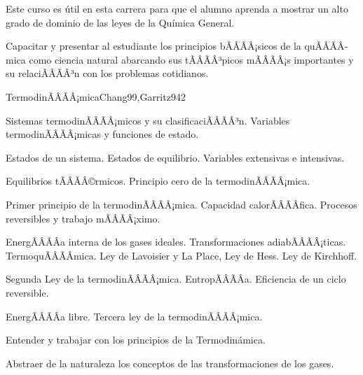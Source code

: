\begin{sumilla}


\begin{fundamentacion}
Este curso es \'util en esta carrera para que el alumno aprenda a mostrar un alto grado de dominio de las leyes de la Qu\'imica General.
\end{fundamentacion}

\begin{objetivosdelcurso}
\item Capacitar y presentar al estudiante los principios bÃÂÃÂ¡sicos de la quÃÂÃÂ­mica como ciencia natural abarcando sus tÃÂÃÂ³picos mÃÂÃÂ¡s importantes y su relaciÃÂÃÂ³n con los problemas cotidianos.
\end{objetivosdelcurso}

\begin{outcomes}
\end{outcomes}

\begin{unit}{TermodinÃÂÃÂ¡mica}{Chang99,Garritz94}{2}
\begin{topicos}
	\item Sistemas termodinÃÂÃÂ¡micos y su clasificaciÃÂÃÂ³n. Variables termodinÃÂÃÂ¡micas y funciones de estado.
	\item Estados de un sistema. Estados de equilibrio. Variables extensivas e intensivas.
	\item Equilibrios tÃÂÃÂ©rmicos. Principio cero de la termodinÃÂÃÂ¡mica.
	\item Primer principio de la termodinÃÂÃÂ¡mica. Capacidad calorÃÂÃÂ­fica. Procesos reversibles y trabajo mÃÂÃÂ¡ximo.
	\item EnergÃÂÃÂ­a interna de los gases ideales. Transformaciones adiabÃÂÃÂ¡ticas. TermoquÃÂÃÂ­mica. Ley de Lavoisier y La Place, Ley de Hess. Ley de Kirchhoff.
	\item Segunda Ley de la termodinÃÂÃÂ¡mica. EntropÃÂÃÂ­a. Eficiencia de un ciclo reversible.
	\item EnergÃÂÃÂ­a libre. Tercera ley de la termodinÃÂÃÂ¡mica.
\end{topicos}

\begin{objetivos}
	\item Entender y trabajar con los principios de la Termodin\'amica.
	\item Abstraer de la naturaleza los conceptos de las transformaciones de los gases.
\end{objetivos}
\end{unit}


\end{sumilla}
